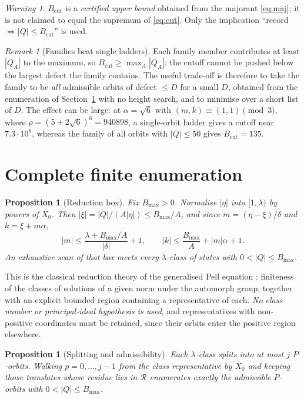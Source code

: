 \documentclass[11pt]{article}
\newtheorem{proposition}[theorem]{Proposition}
\theoremstyle{definition}
\theoremstyle{remark}
\newtheorem{remark}[theorem]{Remark}
\newtheorem{warning}[theorem]{Warning}
\newcommand{\dd}{\delta}
\begin{document}
\begin{warning}\label{warn:sup}
$B_{\mathrm{cut}}$ is a \emph{certified upper bound} obtained from the majorant \eqref{eq:maj};
it is not claimed to equal the supremum of \eqref{eq:cut}. Only the implication
``record $\Rightarrow|Q|\le B_{\mathrm{cut}}$'' is used.
\end{warning}

\begin{remark}[Families beat single ladders]\label{rem:families}
Each family member contributes at least $|Q_A|$ to the maximum, so
$B_{\mathrm{cut}}\ge\max_A|Q_A|$: the cutoff cannot be pushed below the largest defect the
family contains. The useful trade-off is therefore to take the family to be \emph{all}
admissible orbits of defect $\le D$ for a small $D$, obtained from the enumeration of
Section~\ref{sec:enum} with no height search, and to minimise over a short list of $D$. The
effect can be large: at $\alpha=\sqrt6$ with $(m,k)\equiv(1,1)\pmod3$, where
$\rho=(5+2\sqrt6)^6=940898$, a single-orbit ladder gives a cutoff near $7.3\cdot10^{8}$,
whereas the family of all orbits with $|Q|\le50$ gives $B_{\mathrm{cut}}=135$.
\end{remark}

\section{Complete finite enumeration}\label{sec:enum}

\begin{proposition}[Reduction box]\label{prop:box}
Fix $B_{\max}>0$. Normalise $|\eta|$ into $[1,\lambda)$ by powers of $X_0$. Then
$|\xi|=|Q|/(A|\eta|)\le B_{\max}/A$, and since $m=(\eta-\xi)/\dd$ and $k=\xi+m\alpha$,
\[
|m|\le\frac{\lambda+B_{\max}/A}{|\dd|}+1,\qquad
|k|\le\frac{B_{\max}}{A}+|m|\alpha+1 .
\]
An exhaustive scan of that box meets every $\lambda$-class of states with $0<|Q|\le B_{\max}$.
\end{proposition}

This is the classical reduction theory of the generalised Pell equation
\cite{ConradGenPell,BuellBQF,Cohen1993}: finiteness of the classes of solutions of a given norm
under the automorph group, together with an explicit bounded region containing a representative
of each. \emph{No class-number or principal-ideal hypothesis is used}, and representatives with
non-positive coordinates must be retained, since their orbits enter the positive region
elsewhere.

\begin{proposition}[Splitting and admissibility]\label{prop:split}
Each $\lambda$-class splits into at most $j$ $P$-orbits. Walking $p=0,\dots,j-1$ from the class
representative by $X_0$ and keeping those translates whose residue lies in $\mathcal R$
enumerates exactly the admissible $P$-orbits with $0<|Q|\le B_{\max}$.
\end{proposition}
\end{document}
